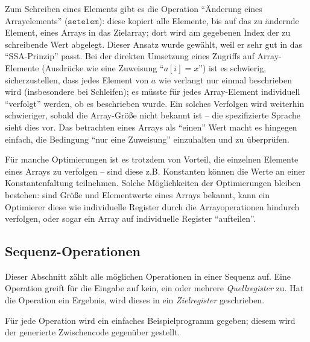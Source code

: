 \documentclass[twoside,a4paper,fleqn,12pt]{book}
\begin{document}
Zum Schreiben eines Elements gibt es die Operation "`Änderung eines Arrayelements"' ($\mathtt{setelem}$):
diese kopiert alle Elemente, bis auf das zu ändernde Element, eines Arrays in das Zielarray;
dort wird am gegebenen Index der zu schreibende Wert abgelegt.
Dieser Ansatz wurde gewählt, weil er sehr gut in das "`SSA-Prinzip"' passt.
Bei der direkten Umsetzung eines Zugriffs auf Array-Elemente (Ausdrücke wie eine Zuweisung "`$a[i] = x$"') ist es schwierig, sicherzustellen, dass
jedes Element von $a$ wie verlangt nur einmal beschrieben wird (insbesondere bei Schleifen); es
müsste für jedes Array-Element individuell "`verfolgt"' werden, ob es beschrieben wurde.
Ein solches Verfolgen wird weiterhin schwieriger, sobald die Array-Größe nicht bekannt ist
-- die spezifizierte Sprache sieht dies vor. Das betrachten eines Arrays als "`einen"' Wert macht es hingegen einfach,
die Bedingung "`nur eine Zuweisung"' einzuhalten und zu überprüfen.

Für manche Optimierungen ist es trotzdem von Vorteil, die einzelnen Elemente eines Arrays zu verfolgen -- sind diese
z.B. Konstanten können die Werte an einer Konstantenfaltung teilnehmen. Solche Möglichkeiten der Optimierungen
bleiben bestehen: sind Größe und Elementwerte eines Arrays bekannt, kann ein Optimierer diese wie individuelle
Register durch die Arrayoperationen hindurch verfolgen, oder sogar ein Array auf individuelle Register "`aufteilen"'.

\subsection{Sequenz-Operationen}

Dieser Abschnitt zählt alle möglichen Operationen in einer Sequenz auf. Eine Operation greift für die Eingabe auf kein, ein oder mehrere
\emph{Quellregister} zu. Hat die Operation ein Ergebnis, wird dieses in ein \emph{Zielregister} geschrieben. 

Für jede Operation wird ein einfaches Beispielprogramm gegeben; diesem wird der generierte Zwischencode gegenüber gestellt.

\end{document}
